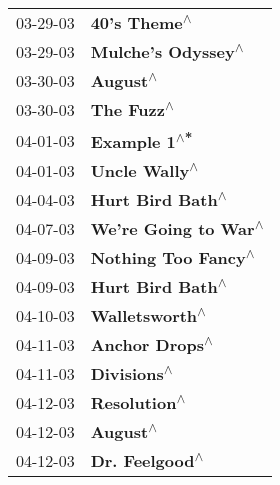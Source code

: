 \begin{supertabular}{p{0.25\columnwidth}p{0.75\columnwidth}}
 03-29-03 &                                                               \textbf{40's Theme\textsuperscript{$\wedge$}} \\
 03-29-03 &                                                         \textbf{Mulche's Odyssey\textsuperscript{$\wedge$}} \\
 03-30-03 &                                                                   \textbf{August\textsuperscript{$\wedge$}} \\
 03-30-03 &                                                                 \textbf{The Fuzz\textsuperscript{$\wedge$}} \\
 04-01-03 &                                                               \textbf{Example 1\textsuperscript{$\wedge$*}} \\
 04-01-03 &                                                              \textbf{Uncle Wally\textsuperscript{$\wedge$}} \\
 04-04-03 &                                                           \textbf{Hurt Bird Bath\textsuperscript{$\wedge$}} \\
 04-07-03 &                                                       \textbf{We're Going to War\textsuperscript{$\wedge$}} \\
 04-09-03 &                                                        \textbf{Nothing Too Fancy\textsuperscript{$\wedge$}} \\
 04-09-03 &                                                           \textbf{Hurt Bird Bath\textsuperscript{$\wedge$}} \\
 04-10-03 &                                                             \textbf{Walletsworth\textsuperscript{$\wedge$}} \\
 04-11-03 &                                                             \textbf{Anchor Drops\textsuperscript{$\wedge$}} \\
 04-11-03 &                                                                \textbf{Divisions\textsuperscript{$\wedge$}} \\
 04-12-03 &                                                               \textbf{Resolution\textsuperscript{$\wedge$}} \\
 04-12-03 &                                                                   \textbf{August\textsuperscript{$\wedge$}} \\
 04-12-03 &                                                             \textbf{Dr. Feelgood\textsuperscript{$\wedge$}} \\

\end{supertabular}

